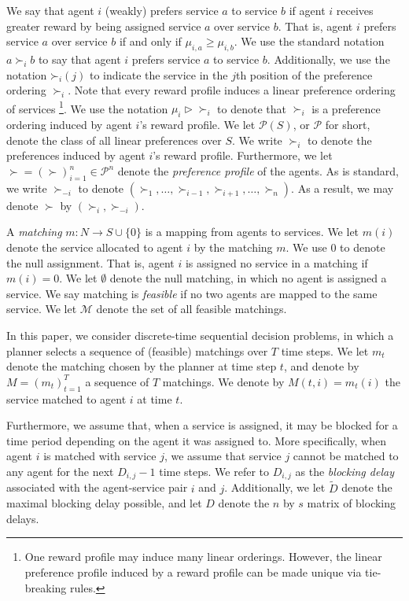 \documentclass[letterpaper,11pt]{article}
\begin{document}
    We say that agent $i$ (weakly) prefers service $a$ to service $b$ if agent $i$ receives greater reward by being assigned service $a$ over service $b$. That is, agent $i$ prefers service $a$ over service $b$ if and only if $\mu_{i, a} \geq \mu_{i, b}$. We use the standard notation $a \succ_{i} b$ to say that agent $i$ prefers service $a$ to service $b$. Additionally, we use the notation $\mathord{\succ}_{i}(j)$ to indicate the service in the $j$th position of the preference ordering $\succ_{i}$.  Note that every reward profile induces a linear preference ordering of services \footnote{One reward profile may induce many linear orderings. However, the linear preference profile induced by a reward profile can be made unique via tie-breaking rules.}. We use the notation $\mu_{i} \rhd \mathord{\succ_{i}}$ to denote that $\succ_{i}$ is a preference ordering induced by agent $i$'s reward profile. We let $\mathcal{P}(S)$, or $\mathcal{P}$ for short, denote the class of all linear preferences over $S$. We write $\succ_{i}$ to denote the preferences induced by agent $i$'s reward profile. Furthermore, we let $\succ = (\succ)_{i=1}^{n} \in  \mathcal{P}^{n}$ denote the \emph{preference profile} of the agents. As is standard, we write $\succ_{-i}$ to denote $(\succ_{1}, \dots, \succ_{i-1}, \succ_{i+1}, \dots, \succ_{n})$. As a result, we may denote $\succ$ by $(\succ_{i}, \succ_{-i})$.
    
    A \emph{matching} $m: N \to S\cup\{0\}$ is a mapping from agents to services. We let $m(i)$ denote the service allocated to agent $i$ by the matching $m$. We use $0$ to denote the null assignment. That is, agent $i$ is assigned no service in a matching if $m(i) = 0$. We let $\emptyset$ denote the null matching, in which no agent is assigned a service. We say matching is \emph{feasible} if no two agents are mapped to the same service. We let $\mathcal{M}$ denote the set of all feasible matchings. 
    
    In this paper, we consider discrete-time sequential decision problems, in which a planner  selects a sequence of (feasible) matchings over $T$ time steps. We let $m_{t}$ denote the matching chosen by the planner at time step $t$, and denote by $M = (m_{t})_{t=1}^{T}$ a sequence of $T$ matchings. We denote by $M(t, i) = m_{t}(i)$ the service matched to agent $i$ at time  $t$.
    
    Furthermore, we assume that, when a service is assigned, it may be blocked for a time period depending on the agent it was assigned to. More specifically, when agent $i$ is matched with service $j$, we assume that service $j$ cannot be matched to any agent for the next $D_{i, j} - 1$ time steps. We refer to $D_{i, j}$ as the \emph{blocking delay} associated with the agent-service pair $i$ and $j$. Additionally, we let $\tilde{D}$ denote the maximal blocking delay possible, and let $D$ denote the $n$ by $s$ matrix of blocking delays.
    
\end{document}

